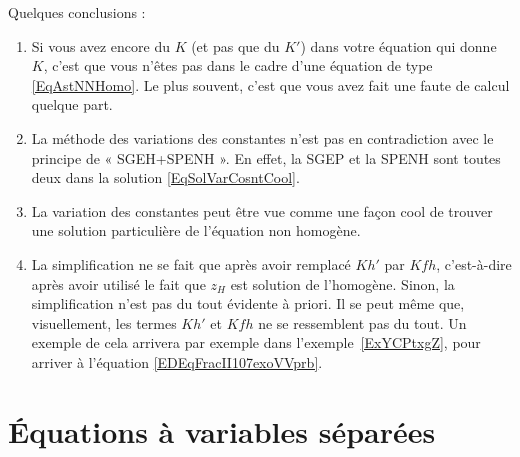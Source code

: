 Quelques conclusions :

\begin{enumerate}
	\item
	      Si vous avez encore du \( K\) (et pas que du \( K'\)) dans votre équation qui donne \( K\), c'est que vous n'êtes pas dans le cadre d'une équation de type \eqref{EqAstNNHomo}. Le plus souvent, c'est que vous avez fait une faute de calcul quelque part.

	\item
	      La méthode des variations des constantes n'est pas en contradiction avec le principe de « SGEH+SPENH ». En effet, la SGEP et la SPENH sont toutes deux dans la solution \eqref{EqSolVarCosntCool}.

	\item
	      La variation des constantes peut être vue comme une façon cool de trouver une solution particulière de l'équation non homogène.

	\item
	      La simplification ne se fait que après avoir remplacé \( Kh'\) par \( Kfh\), c'est-à-dire après avoir utilisé le fait que \( z_H\) est solution de l'homogène. Sinon, la simplification n'est pas du tout évidente à priori. Il se peut même que, visuellement, les termes \( Kh'\) et \( Kfh\) ne se ressemblent pas du tout. Un exemple de cela arrivera par exemple dans l'exemple~\ref{ExYCPtxgZ}, pour arriver à l'équation \eqref{EDEqFracII107exoVVprb}.

\end{enumerate}


\section{Équations à variables séparées}
\label{Secvarsep}


